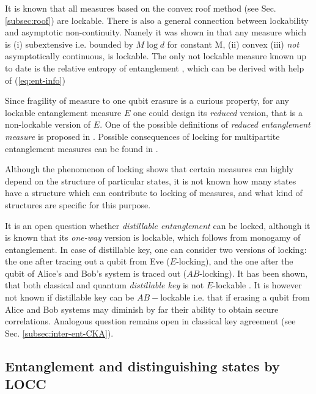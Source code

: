 \documentclass[rmp,12pt,preprint]{revtex4-2}
\begin{document}
It is known that all measures based on the convex roof method (see Sec. \ref{subsec:roof}) are lockable. There is also a general connection between lockability and
asymptotic non-continuity. Namely it was shown in \cite{lock-ent} that
any measure which is (i) subextensive i.e. bounded by $M \log d$ for
constant M, (ii) convex (iii) {\it not} asymptotically continuous, is
lockable. The only not lockable measure known up to date is the
relative entropy of entanglement \cite{lock-ent},
which can be derived with help of (\ref{eq:ent-info})


Since fragility of measure to one qubit erasure is a curious property,
for any lockable entanglement measure $E$ one could design its {\it
reduced} version, that is a non-lockable version of $E$.
One of the possible definitions of {\it reduced entanglement measure} is proposed in \cite{lock-ent}. Possible consequences of locking for multipartite entanglement
measures can be found in \cite{GroismanLindenPopescu}.

Although the phenomenon of locking shows that certain measures can
highly depend on the structure of particular states, it is not known how many
states have a structure which can contribute to locking of measures,
and what kind of structures are specific for this purpose.


It is an open question whether {\it distillable entanglement} can be
locked, although it is known that its {\it one-way} version is
lockable, which follows from monogamy of entanglement. In case of
distillable key, one can consider two versions of locking: the one
after tracing out a qubit from Eve ($E$-locking), and the one after
the qubit of Alice's and Bob's system is traced out ($AB$-locking).
It has been shown, that both classical and quantum {\it distillable
  key} is not $E$-lockable
\cite{renner-wolf-gap,EkertCHHOR2006-ABEkey}. It is however not known
if distillable key can be $AB-$lockable i.e. that if erasing a qubit
from Alice and Bob systems may diminish by far their ability to obtain
secure correlations. Analogous question remains open in classical key
agreement (see Sec. \ref{subsec:inter-ent-CKA}).



\subsection{Entanglement and distinguishing states by LOCC}
\label{sec:rozroz}
\end{document}
